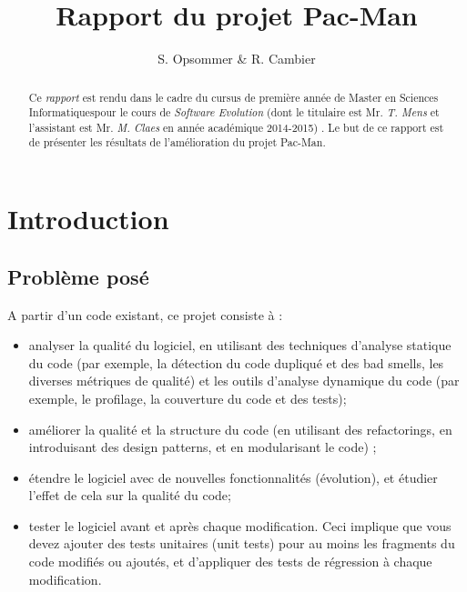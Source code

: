 \documentclass[12pt,a4paper,final]{article}
\author{S. Opsommer \& R. Cambier}
\title{Rapport du projet Pac-Man}
\begin{document}
\umonsCoverPage
\pagebreak
\pagestyle{fancy}
\newpage
\thispagestyle{empty}
\begin{abstract}
Ce \emph{rapport} est rendu dans le cadre du cursus de première année de \og Master en Sciences Informatiques\fg  pour le cours de \emph{Software Evolution} (dont le titulaire est Mr. \emph{T. Mens} et l'assistant est Mr. \emph{M. Claes} en année académique 2014-2015) . Le but de ce rapport est de présenter les résultats de l'amélioration du projet Pac-Man.
\end{abstract}


\newpage
\thispagestyle{empty}
\tableofcontents
\newpage
\section{Introduction}\label{sec:intro}
\subsection{Problème posé}
A partir d'un code existant, ce projet consiste à : 
\begin{itemize}
\item analyser la qualité du logiciel, en utilisant des techniques d'analyse statique du code (par exemple, la détection du code dupliqué et des bad smells, les diverses métriques de qualité) et les outils d'analyse dynamique du code (par exemple, le profilage, la couverture du code et des tests);
\item améliorer la qualité et la structure du code (en utilisant des refactorings, en introduisant des design patterns, et en modularisant le code) ;
\item étendre le logiciel avec de nouvelles fonctionnalités (évolution), et étudier l'effet de cela sur la qualité du code;
\item tester le logiciel avant et après chaque modification. Ceci implique que vous devez ajouter des tests unitaires (unit tests) pour au moins les fragments du code modifiés ou ajoutés, et d'appliquer des tests de régression à chaque modification.
\end{itemize}
\end{document}
